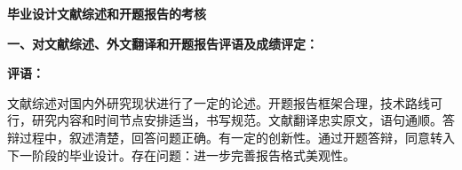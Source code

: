 
\thispagestyle{empty}

{
	\setlength{\parindent}{0em}
	\renewcommand{\baselinestretch}{2}

	{
		\stfangsong\sanhao\bfseries
		\centering
		毕业设计文献综述和开题报告的考核 \par
	}

	{
		{\kaiti\sihao\bfseries
				一、对文献综述、外文翻译和开题报告评语及成绩评定：}

			{\songti\sihao \bfseries
				评语： \\
      }
      
      \vspace{2em}
      
      {\songti \xiaosi 文献综述对国内外研究现状进行了一定的论述。开题报告框架合理，技术路线可行，研究内容和时间节点安排适当，书写规范。文献翻译忠实原文，语句通顺。答辩过程中，叙述清楚，回答问题正确。有一定的创新性。通过开题答辩，同意转入下一阶段的毕业设计。存在问题：进一步完善报告格式美观性。}

		\vspace{12em}





	}

	\vspace{2em}

}
